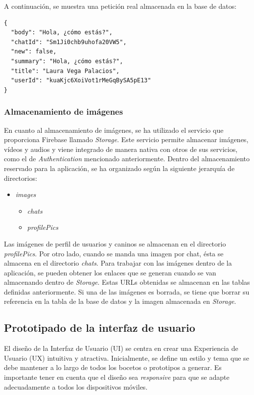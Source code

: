 \documentclass[a4paper, 12pt]{article}
\begin{document}
A continuación, se muestra una petición real almacenada en la base de datos:

\begin{verbatim}
{
  "body": "Hola, ¿cómo estás?",
  "chatId": "Sm1Ji0chb9uhofa20VW5",
  "new": false,
  "summary": "Hola, ¿cómo estás?",
  "title": "Laura Vega Palacios",
  "userId": "kuaKjc6XoiVot1rMeGqBySA5pE13"
}
\end{verbatim}

\subsubsection{Almacenamiento de imágenes}

En cuanto al almacenamiento de imágenes, se ha utilizado el servicio que proporciona Firebase llamado \textit{Storage}. Este servicio permite almacenar imágenes, vídeos y audios y viene integrado de manera nativa con otros de sus servicios, como el de \textit{Authentication} mencionado anteriormente. Dentro del almacenamiento reservado para la aplicación, se ha organizado según la siguiente jerarquía de directorios:

\begin{itemize}[noitemsep]
	\item \textit{images}
	\begin{itemize}[noitemsep]
		\item \textit{chats}
		\item \textit{profilePics}
	\end{itemize}
\end{itemize}

Las imágenes de perfil de usuarios y caninos se almacenan en el directorio \textit{profilePics}. Por otro lado, cuando se manda una imagen por chat, ésta se almacena en el directorio \textit{chats}. Para trabajar con las imágenes dentro de la aplicación, se pueden obtener los enlaces que se generan cuando se van almacenando dentro de \textit{Storage}. Estas URLs obtenidas se almacenan en las tablas definidas anteriormente. Si una de las imágenes es borrada, se tiene que borrar su referencia en la tabla de la base de datos y la imagen almacenada en \textit{Storage}.

\subsection{Prototipado de la interfaz de usuario}

El diseño de la Interfaz de Usuario (UI) se centra en crear una Experiencia de Usuario (UX) intuitiva y atractiva. Inicialmente, se define un estilo y tema que se debe mantener a lo largo de todos los bocetos o prototipos a generar. Es importante tener en cuenta que el diseño sea \textit{responsive} para que se adapte adecuadamente a todos los dispositivos móviles.
\end{document}
